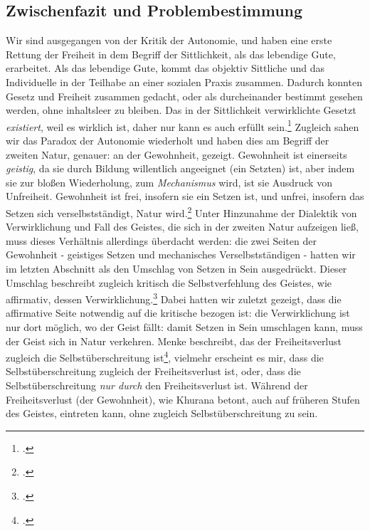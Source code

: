 \documentclass[12pt, a4paper, openany]{report}
\begin{document}
\subsection{Zwischenfazit und Problembestimmung}\label{zwisschenfazit}
Wir sind ausgegangen von der Kritik der Autonomie, und haben eine erste Rettung der Freiheit in dem Begriff der Sittlichkeit, als das lebendige Gute, erarbeitet. 
Als das lebendige Gute, kommt das objektiv Sittliche und das Individuelle in der Teilhabe an einer sozialen Praxis zusammen. 
Dadurch konnten Gesetz und Freiheit zusammen gedacht, oder als durcheinander bestimmt gesehen werden, ohne inhaltsleer zu bleiben.
Das in der Sittlichkeit verwirklichte Gesetzt \emph{existiert}, weil es wirklich ist, daher nur kann es auch erfüllt sein.\footcite[Vgl.][57]{menke_autonomie_2018}
Zugleich sahen wir das Paradox der Autonomie wiederholt und haben dies am Begriff der zweiten Natur, genauer: an der Gewohnheit, gezeigt.
Gewohnheit ist einerseits \emph{geistig}, da sie durch Bildung willentlich angeeignet (ein Setzten) ist, aber indem sie zur bloßen Wiederholung, zum \emph{Mechanismus} wird, ist sie  Ausdruck von Unfreiheit.
Gewohnheit ist frei, insofern sie ein Setzen ist, und unfrei, insofern das Setzen sich verselbstständigt, Natur wird.\footcite[Vgl.][145]{menke_autonomie_2018}
Unter Hinzunahme der Dialektik von Verwirklichung und Fall des Geistes, die sich in der zweiten Natur aufzeigen ließ, muss dieses Verhältnis allerdings überdacht werden:
die zwei Seiten der Gewohnheit - geistiges Setzen und mechanisches Verselbstständigen - hatten wir im letzten Abschnitt als den Umschlag von Setzen in Sein ausgedrückt. 
Dieser Umschlag beschreibt zugleich kritisch die Selbstverfehlung des Geistes, wie affirmativ, dessen Verwirklichung.\footcite[Vgl.][145]{menke_autonomie_2018}
Dabei hatten wir zuletzt gezeigt, dass die affirmative Seite notwendig auf die kritische bezogen ist: 
die Verwirklichung ist nur dort möglich, wo der Geist fällt: 
damit Setzen in Sein umschlagen kann, muss der Geist sich in Natur verkehren. 
Menke beschreibt, das der Freiheitsverlust zugleich die Selbstüberschreitung ist\footcite[Vgl.][145]{menke_autonomie_2018}, vielmehr erscheint es mir, dass die Selbstüberschreitung zugleich der Freiheitsverlust ist, oder, dass die Selbstüberschreitung \emph{nur durch} den Freiheitsverlust ist. 
Während der Freiheitsverlust (der Gewohnheit), wie Khurana betont, auch auf früheren Stufen des Geistes, eintreten kann, ohne zugleich Selbstüberschreitung zu sein.%
\end{document}
